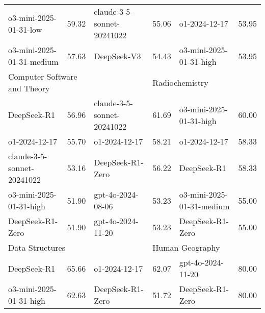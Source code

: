 {\begin{longtable}{p{4.2cm}>{\centering\arraybackslash} p{0.8cm}|p{4.2cm} >{\centering\arraybackslash} p{0.8cm}|p{4.2cm} >{\centering\arraybackslash} p{0.8cm}}
\cellcolor{blue!5} o3-mini-2025-01-31-low & \cellcolor{blue!2}59.32 & \cellcolor{purple!5} claude-3-5-sonnet-20241022 & \cellcolor{purple!2} 55.06 & \cellcolor{green!5} o1-2024-12-17 & \cellcolor{green!2} 53.95\\
\cellcolor{blue!5} o3-mini-2025-01-31-medium & \cellcolor{blue!2}57.63 & \cellcolor{purple!5} DeepSeek-V3 & \cellcolor{purple!2} 54.43 & \cellcolor{green!5} o3-mini-2025-01-31-high & \cellcolor{green!2} 53.95\\
\hline
\multicolumn{2}{p{5.15cm}|}{\cellcolor{blue!10} \centering Computer Software and Theory} & \multicolumn{2}{p{5.15cm}|}{\cellcolor{purple!10} \centering Fine Arts} & \multicolumn{2}{p{5.15cm}}{\cellcolor{green!10} \centering Radiochemistry}\\
\hline
\cellcolor{blue!5} DeepSeek-R1 & \cellcolor{blue!2}56.96 & \cellcolor{purple!5} claude-3-5-sonnet-20241022 & \cellcolor{purple!2} 61.69 & \cellcolor{green!5} o3-mini-2025-01-31-high & \cellcolor{green!2} 60.00\\
\cellcolor{blue!5} o1-2024-12-17 & \cellcolor{blue!2}55.70 & \cellcolor{purple!5} o1-2024-12-17 & \cellcolor{purple!2} 58.21 & \cellcolor{green!5} o1-2024-12-17 & \cellcolor{green!2} 58.33\\
\cellcolor{blue!5} claude-3-5-sonnet-20241022 & \cellcolor{blue!2}53.16 & \cellcolor{purple!5} DeepSeek-R1-Zero & \cellcolor{purple!2} 56.22 & \cellcolor{green!5} DeepSeek-R1 & \cellcolor{green!2} 58.33\\
\cellcolor{blue!5} o3-mini-2025-01-31-high & \cellcolor{blue!2}51.90 & \cellcolor{purple!5} gpt-4o-2024-08-06 & \cellcolor{purple!2} 53.23 & \cellcolor{green!5} o3-mini-2025-01-31-medium & \cellcolor{green!2} 55.00\\
\cellcolor{blue!5} DeepSeek-R1-Zero & \cellcolor{blue!2}51.90 & \cellcolor{purple!5} gpt-4o-2024-11-20 & \cellcolor{purple!2} 53.23 & \cellcolor{green!5} DeepSeek-R1-Zero & \cellcolor{green!2} 55.00\\
\hline
\multicolumn{2}{p{5.15cm}|}{\cellcolor{blue!10} \centering Data Structures} & \multicolumn{2}{p{5.15cm}|}{\cellcolor{purple!10} \centering Communication and Broadcasting} & \multicolumn{2}{p{5.15cm}}{\cellcolor{green!10} \centering Human Geography}\\
\hline
\cellcolor{blue!5} DeepSeek-R1 & \cellcolor{blue!2}65.66 & \cellcolor{purple!5} o1-2024-12-17 & \cellcolor{purple!2} 62.07 & \cellcolor{green!5} gpt-4o-2024-11-20 & \cellcolor{green!2} 80.00\\
\cellcolor{blue!5} o3-mini-2025-01-31-high & \cellcolor{blue!2}62.63 & \cellcolor{purple!5} DeepSeek-R1-Zero & \cellcolor{purple!2} 51.72 & \cellcolor{green!5} DeepSeek-R1-Zero & \cellcolor{green!2} 80.00\\

\end{longtable}}
